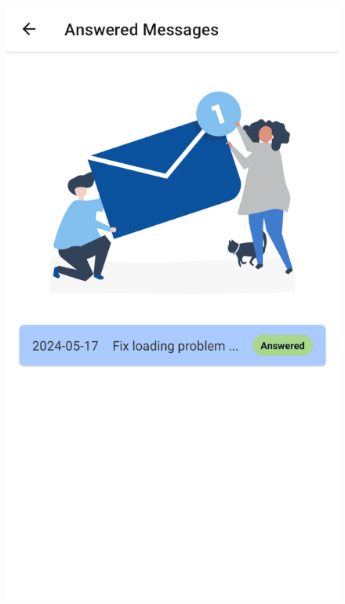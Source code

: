 \begin{figure}[H]
\begin{minipage}{0.35\textwidth}
    \centering
    \includegraphics[width=\linewidth]{images/sprint4/feedBackModule (4).png}
    \label{fig:login-form-filled}
\end{minipage}\hfill
\begin{minipage}{0.35\textwidth}
    \centering

\end{minipage}
\end{figure}
